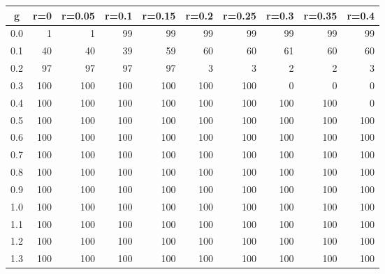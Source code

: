 %
\begin{table}[!tbp]
 \begin{center}
 \begin{tabular}{rrrrrrrrrr}\hline\hline
\multicolumn{1}{c}{g}&\multicolumn{1}{c}{r=0}&\multicolumn{1}{c}{r=0.05}&\multicolumn{1}{c}{r=0.1}&\multicolumn{1}{c}{r=0.15}&\multicolumn{1}{c}{r=0.2}&\multicolumn{1}{c}{r=0.25}&\multicolumn{1}{c}{r=0.3}&\multicolumn{1}{c}{r=0.35}&\multicolumn{1}{c}{r=0.4}\tabularnewline
\hline
0.0&  1&  1& 99& 99& 99& 99& 99& 99& 99\tabularnewline
0.1& 40& 40& 39& 59& 60& 60& 61& 60& 60\tabularnewline
0.2& 97& 97& 97& 97&  3&  3&  2&  2&  3\tabularnewline
0.3&100&100&100&100&100&100&  0&  0&  0\tabularnewline
0.4&100&100&100&100&100&100&100&100&  0\tabularnewline
0.5&100&100&100&100&100&100&100&100&100\tabularnewline
0.6&100&100&100&100&100&100&100&100&100\tabularnewline
0.7&100&100&100&100&100&100&100&100&100\tabularnewline
0.8&100&100&100&100&100&100&100&100&100\tabularnewline
0.9&100&100&100&100&100&100&100&100&100\tabularnewline
1.0&100&100&100&100&100&100&100&100&100\tabularnewline
1.1&100&100&100&100&100&100&100&100&100\tabularnewline
1.2&100&100&100&100&100&100&100&100&100\tabularnewline
1.3&100&100&100&100&100&100&100&100&100\tabularnewline
\hline
\end{tabular}

\end{center}

\end{table}

